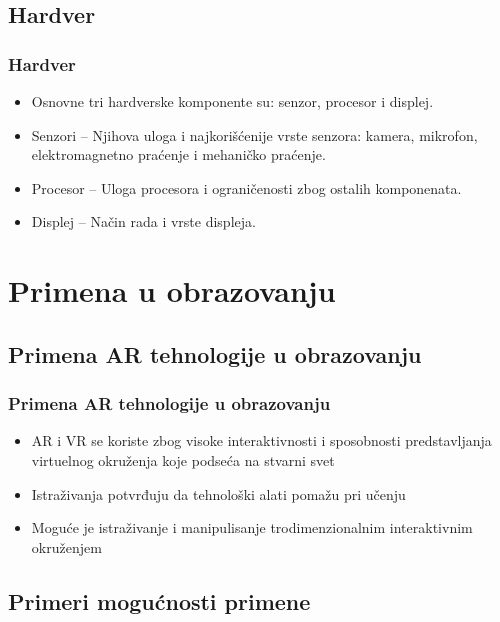 \documentclass[9pt]{beamer}
\begin{document}
\subsection{Hardver}
	\begin{frame}
 \frametitle{Hardver}
        \begin{itemize}
            \setlength\itemsep{1.5em}
                \item Osnovne tri hardverske komponente su: senzor, procesor i displej.
                \item Senzori – Njihova uloga i najkorišćenije vrste senzora: kamera, mikrofon, elektromagnetno praćenje i mehaničko praćenje.
                \item Procesor – Uloga procesora i ograničenosti zbog ostalih komponenata.
                \item Displej – Način rada i vrste displeja.
        \end{itemize}
            
	\end{frame}



 
\section{Primena u obrazovanju}
\subsection{Primena AR  tehnologije u obrazovanju}
	\begin{frame} 
 \frametitle{Primena AR  tehnologije u obrazovanju}
    \begin{itemize}
    \setlength\itemsep{1.5em}
            \item AR i VR se koriste zbog visoke interaktivnosti i sposobnosti predstavljanja virtuelnog okruženja koje podseća na stvarni svet
            \item Istraživanja potvrđuju da tehnološki alati pomažu pri učenju
            \item Moguće je istraživanje i manipulisanje trodimenzionalnim interaktivnim okruženjem 
    \end{itemize}
 
	\end{frame}



 
\subsection{Primeri mogućnosti primene}
\end{document}
